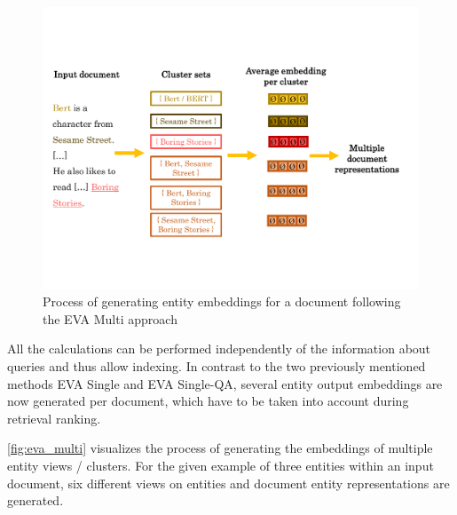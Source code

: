 \begin{figure}[!htb]
    \centering
    \includegraphics[trim={0cm 3cm 0cm 3.5cm}, clip, width=\textwidth]{resources/eva_multi} 
    \caption{Process of generating entity embeddings for a document following the EVA Multi approach}
    \label{fig:eva_multi}
\end{figure}

All the calculations can be performed independently of the information about queries and thus allow indexing. In contrast to the two previously mentioned methods EVA Single and EVA Single-QA, several entity output embeddings are now generated per document, which have to be taken into account during retrieval ranking. 

\autoref{fig:eva_multi} visualizes the process of generating the embeddings of multiple entity views / clusters. For the given example of three entities within an input document, six different views on entities and document entity representations are generated.


